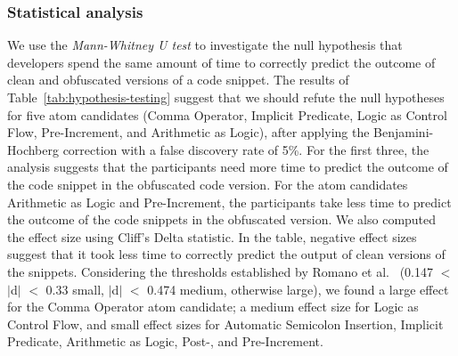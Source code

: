 \subsubsection*{Statistical analysis}
We use the \emph{Mann-Whitney U test} to
investigate the null hypothesis that developers 
spend the same amount of time to correctly
predict the outcome of clean and obfuscated versions of a code snippet.
The results of Table~\ref{tab:hypothesis-testing}
suggest that we should refute the null hypotheses for five atom candidates (Comma Operator, Implicit Predicate, Logic as Control Flow, Pre-Increment, and Arithmetic as Logic), after applying the Benjamini-Hochberg correction with a false discovery rate of 5\%. For the first three, the analysis suggests that the participants need more time to predict the outcome of the code snippet in the obfuscated code version. For the atom candidates Arithmetic as Logic and Pre-Increment, the participants take less time to predict the outcome of the code snippets in the obfuscated version. We also computed the effect size using Cliff's Delta statistic. In the table, negative effect sizes suggest that it took less time to correctly predict the output of clean versions of the snippets.  Considering the thresholds established by Romano et al.~\cite{Romano:2006:ASO} (0.147 $<$ $|$d$|$ $<$ 0.33 small, $|$d$|$ $<$ 0.474 medium, otherwise large), we found a large effect for the Comma Operator atom candidate; a medium effect size for Logic as Control Flow, and small effect sizes for Automatic Semicolon Insertion, Implicit Predicate, Arithmetic as Logic, Post-, and Pre-Increment. 






